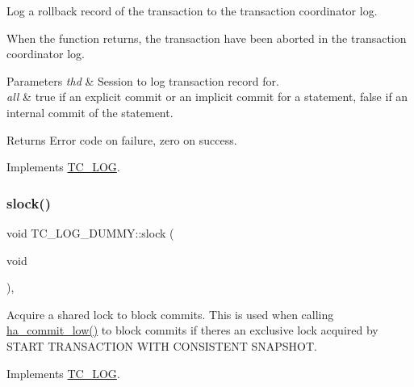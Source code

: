 Log a rollback record of the transaction to the transaction coordinator log.

When the function returns, the transaction have been aborted in the transaction coordinator log.


\begin{DoxyParams}{Parameters}
{\em thd} & Session to log transaction record for.\\
\hline
{\em all} & {\ttfamily true} if an explicit commit or an implicit commit for a statement, {\ttfamily false} if an internal commit of the statement.\\
\hline
\end{DoxyParams}
\begin{DoxyReturn}{Returns}
Error code on failure, zero on success. 
\end{DoxyReturn}


Implements \mbox{\hyperlink{classTC__LOG_abf637f1bbf02c6f8e4f69aa2f5e2d362}{T\+C\+\_\+\+L\+OG}}.

\mbox{\label{classTC__LOG__DUMMY_a144eb01c40fb75ae3a1c04609dc89ea3}} 
\subsubsection{\texorpdfstring{slock()}{slock()}}
{\footnotesize\ttfamily void T\+C\+\_\+\+L\+O\+G\+\_\+\+D\+U\+M\+M\+Y\+::slock (\begin{DoxyParamCaption}\item[{void}]{ }\end{DoxyParamCaption})\hspace{0.3cm}{\ttfamily [inline]}, {\ttfamily [virtual]}}

Acquire a shared lock to block commits. This is used when calling \mbox{\hyperlink{handler_8cc_a4a77fdd0e1d6bee79e29e7495c7d752a}{ha\+\_\+commit\+\_\+low()}} to block commits if there\textquotesingle{}s an exclusive lock acquired by S\+T\+A\+RT T\+R\+A\+N\+S\+A\+C\+T\+I\+ON W\+I\+TH C\+O\+N\+S\+I\+S\+T\+E\+NT S\+N\+A\+P\+S\+H\+OT. 

Implements \mbox{\hyperlink{classTC__LOG_a5b73af1ad12c691b3417c565f7e58a1c}{T\+C\+\_\+\+L\+OG}}.

\mbox{\label{classTC__LOG__DUMMY_a5ab2da6fa3688756cf9694d25db67c6c}} 
